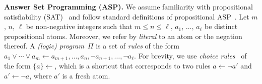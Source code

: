 \documentclass{article}
\def\SAT{\textsf{SAT}\xspace}
\begin{document}
\smallskip
\noindent\textbf{Answer Set Programming (ASP).} %
%
We assume familiarity with propositional satisfiability (\SAT)~\cite{KleineBuningLettman99}
and follow standard definitions of propositional ASP~\cite{BrewkaEiterTruszczynski11}.
%
Let $m$, $n$, $\ell$ be non-negative integers such that
$m \leq n \leq \ell$, $a_1$, $\ldots$, $a_\ell$ be distinct propositional
atoms. Moreover, we refer by \emph{literal} to an atom or the negation
thereof.
%
A \emph{(logic) program}~$\Pi$ is a set of \emph{rules} of the form
%
\(
a_1\vee \cdots \vee a_m \leftarrow a_{m+1}, \ldots, a_{n}, \neg
a_{n+1}, \ldots, \neg a_\ell.
%
\)
%
For brevity, we use \emph{choice rules}~\cite{SimonsNiemelaeSoininen02} of the form $\{a\} \leftarrow$, which is a shortcut that corresponds to two rules $a \leftarrow \neg a'$ and $a' \leftarrow \neg a$, where $a'$ is a fresh atom.
%
%
%
%
%
%
%
%
%
\end{document}
